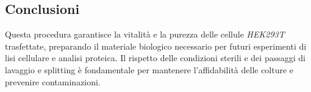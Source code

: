 \subsection{Conclusioni}
Questa procedura garantisce la vitalità e la purezza delle cellule \textit{HEK293T} trasfettate, preparando il materiale biologico necessario per futuri esperimenti di lisi cellulare e analisi proteica. Il rispetto delle condizioni sterili e dei passaggi di lavaggio e splitting è fondamentale per mantenere l’affidabilità delle colture e prevenire contaminazioni.

\newpage
